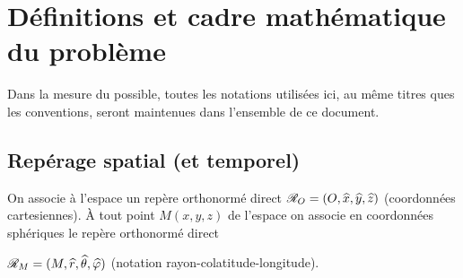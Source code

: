 \section{Définitions et cadre mathématique du problème}\label{definition}


Dans la mesure du possible, toutes les notations utilisées ici, au même titres ques les conventions,
seront maintenues dans l'ensemble de ce document.


\subsection{Repérage spatial (et temporel)}


On associe à l'espace un repère orthonormé direct $\mathscr{R}_O = (O,\widehat{x},\widehat{y},\widehat{z})$ (coordonnées cartesiennes).
À tout point $M(x,y,z)$ de l'espace on associe en coordonnées sphériques le repère orthonormé direct

$\mathscr{R}_M = (M,\widehat{r},\widehat{\theta},\widehat{\varphi})$ (notation rayon-colatitude-longitude).


